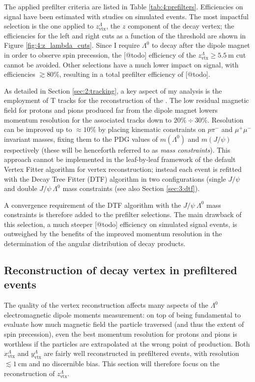 The applied prefilter criteria are listed in Table \ref{tab:4:prefilters}.
Efficiencies on signal have been estimated with studies on simulated \demonstratorshort events.
The most impactful selection is the one applied to $z_\text{vtx}^\Lambda$, the $z$ component of the \lambdadecay decay vertex;
the efficiencies for the left and right cuts as a function of the threshold are shown in Figure \ref{fig:4:z_lambda_cuts}.
Since I require $\Lambda^0$ to decay after the dipole magnet in order to observe spin precession, the [@todo] efficiency of the $z_\text{vtx}^\Lambda \geq \SI{5.5}{\meter}$ cut cannot be avoided.
Other selections have a much lower impact on signal, with efficiencies $\gtrsim 80\%$, resulting in a total prefilter efficiency of [@todo].

As detailed in Section \ref{sec:2:tracking}, a key aspect of my analysis is the employment of T tracks for the reconstruction of the \lz.
The low residual magnetic field for protons and pions produced far from the dipole magnet lowers momentum resolution for the associated tracks down to $20\% \div 30\%$.
Resolution can be improved up to $\approx 10\%$ by placing kinematic constraints on $p\pi^-$ and $\mu^+ \mu^-$ invariant masses, fixing them to the PDG values of $m(\Lambda^0)$ and $m(J/\psi)$ respectively (these will be henceforth referred to as \textit{mass constraints}).
This approach cannot be implemented in the leaf-by-leaf framework of the default Vertex Fitter algorithm for vertex reconstruction;
instead each event is refitted with the Decay Tree Fitter (DTF) algorithm in two configurations (single $J/\psi$ and double $J/\psi~\Lambda^0$ mass constraints (see also Section \ref{sec:3:dtf}).

A convergence requirement of the DTF algorithm with the $J/\psi~\Lambda^0$ mass constraints is therefore added to the prefilter selections.
The main drawback of this selection, a much steeper [@todo] efficiency on simulated signal events, is outweighed by the benefits of the improved momentum resolution in the determination of the angular distribution of \lambdadecay decay products.


\subsection{Reconstruction of \texorpdfstring{\lz}{Lambda} decay vertex in prefiltered events}
\label{sec:lambda_endvertex_bias}

The quality of the \lambdadecay vertex reconstruction affects many aspects of the $\Lambda^0$ electromagnetic dipole moments measurement:
on top of being fundamental to evaluate how much magnetic field the particle traversed (and thus the extent of spin precession), even the best momentum resolution for protons and pions is worthless if the particles are extrapolated at the wrong point of production.
Both $x_\text{vtx}^\Lambda$ and $y_\text{vtx}^\Lambda$ are fairly well reconstructed in prefiltered events, with resolution $\lesssim \SI{1}{\centi\meter}$ and no discernible bias.
This section will therefore focus on the reconstruction of $z_\text{vtx}^\Lambda$.

